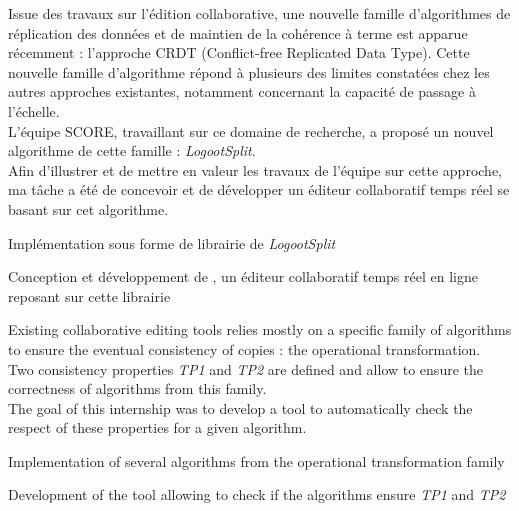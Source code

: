 \hfill\begin{minipage}{\dimexpr\textwidth-0.5cm}
Issue des travaux sur l'édition collaborative, une nouvelle famille d'algorithmes de réplication des données
et de maintien de la cohérence à terme est apparue récemment : l'approche CRDT (Conflict-free Replicated Data Type).
Cette nouvelle famille d'algorithme répond à plusieurs des limites constatées chez les autres approches existantes,
notamment concernant la capacité de passage à l'échelle.
\\
L'équipe SCORE, travaillant sur ce domaine de recherche, a proposé un nouvel algorithme de cette famille : \emph{LogootSplit}.
\\
Afin d'illustrer et de mettre en valeur les travaux de l'équipe sur cette approche,
ma tâche a été de concevoir et de développer un éditeur collaboratif temps réel se basant sur cet algorithme.
\begin{tightemize}
\item Implémentation sous forme de librairie de \emph{LogootSplit}
\item Conception et développement de \href{https://www.coedit.re}{}, un éditeur collaboratif temps réel en ligne reposant sur cette librairie
\end{tightemize}
\sectionsep\xdef\tpd{\the\prevdepth}
\end{minipage}

\sectionsep

\hfill\begin{minipage}{\dimexpr\textwidth-0.5cm}
Existing collaborative editing tools relies mostly on a specific family of algorithms
to ensure the eventual consistency of copies : the operational transformation.
\\
Two consistency properties \emph{TP1} and \emph{TP2} are defined and allow to ensure the correctness of algorithms from this family.
\\
The goal of this internship was to develop a tool to automatically check the respect of these properties for a given algorithm.
\begin{tightemize}
\item Implementation of several algorithms from the operational transformation family
\item Development of the tool allowing to check if the algorithms ensure \emph{TP1} and \emph{TP2}
\end{tightemize}
\sectionsep\xdef\tpd{\the\prevdepth}
\end{minipage}

